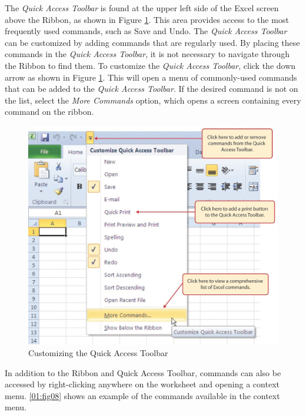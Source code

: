 The \textit{Quick Access Toolbar} is found at the upper left side of the Excel screen above the Ribbon, as shown in Figure \ref{01:fig07}. This area provides access to the most frequently used commands, such as Save and Undo. The \textit{Quick Access Toolbar} can be customized by adding commands that are regularly used. By placing these commands in the \textit{Quick Access Toolbar}, it is not necessary to navigate through the Ribbon to find them. To customize the \textit{Quick Access Toolbar}, click the down arrow as shown in Figure \ref{01:fig07}. This will open a menu of commonly-used commands that can be added to the \textit{Quick Access Toolbar}. If the desired command is not on the list, select the \textit{More Commands} option, which opens a screen containing every command on the ribbon.

\begin{figure}[H]
	\centering
	\includegraphics[width=\maxwidth{.95\linewidth}]{gfx/ch01_fig07}
	\caption{Customizing the Quick Access Toolbar}
	\label{01:fig07}
\end{figure}

In addition to the Ribbon and Quick Access Toolbar, commands can also be accessed by right-clicking anywhere on the worksheet and opening a context menu. \ref{01:fig08} shows an example of the commands available in the context menu.

